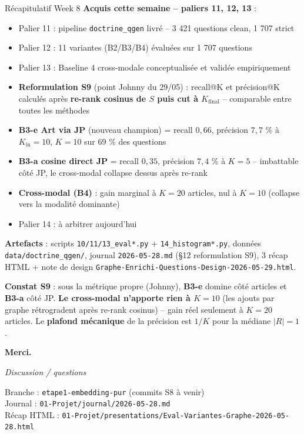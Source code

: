 \documentclass[aspectratio=169,10pt]{beamer}
\newcommand{\okbox}[1]{%
  \begin{center}
  \colorbox{green!10}{\parbox{0.92\linewidth}{\centering #1}}
  \end{center}}
\begin{document}
\begin{frame}{Récapitulatif Week 8}
  \footnotesize
  \textbf{Acquis cette semaine -- paliers 11, 12, 13} :
  \begin{itemize}\setlength\itemsep{0.2em}
    \item Palier 11 : pipeline \texttt{doctrine\_qgen} livré -- 3 421 questions clean, 1 707 strict
    \item Palier 12 : 11 variantes (B2/B3/B4) évaluées sur 1 707 questions
    \item Palier 13 : Baseline 4 cross-modale conceptualisée et validée empiriquement
    \item \textbf{Reformulation S9} (point Johnny du 29/05) : recall@K et précision@K calculés
    après \textbf{re-rank cosinus de $S$ puis cut à $K_{\text{final}}$} -- comparable entre
    toutes les méthodes
    \item \textbf{B3-e Art via JP} (nouveau champion) = recall $0{,}66$, précision $7{,}7$ \%
    à $K_{\text{in}}{=}10$, $K{=}10$ sur 69 \% des questions
    \item \textbf{B3-a cosine direct JP} = recall $0{,}35$, précision $7{,}4$ \% à $K{=}5$
    -- imbattable côté JP, le cross-modal collapse dessus après re-rank
    \item \textbf{Cross-modal (B4)} : gain marginal à $K{=}20$ articles, nul à $K{=}10$
    (collapse vers la modalité dominante)
    \item Palier 14 : à arbitrer aujourd'hui
  \end{itemize}

  \vspace{0.3em}
  \textbf{Artefacts} : scripts \texttt{10/11/13\_eval*.py} + \texttt{14\_histogram*.py},
  données \texttt{data/doctrine\_qgen/}, journal \texttt{2026-05-28.md} (§12 reformulation S9),
  3 récap HTML + note de design \texttt{Graphe-Enrichi-Questions-Design-2026-05-29.html}.

  \vspace{0.3em}
  \okbox{\textbf{Constat S9} : sous la métrique propre (Johnny), \textbf{B3-e} domine côté
  articles et \textbf{B3-a} côté JP. \textbf{Le cross-modal n'apporte rien à $K{=}10$}
  (les ajouts par graphe rétrogradent après re-rank cosinus) -- gain réel seulement à $K{=}20$
  articles. Le \textbf{plafond mécanique} de la précision est $1/K$ pour la médiane $|R|=1$.}
\end{frame}

\begin{frame}
  \begin{center}
    \vspace{2em}
    {\Large\textbf{Merci.}}
    \vspace{2em}

    \textit{Discussion / questions}

    \vspace{2em}
    \footnotesize
    Branche : \texttt{etape1-embedding-pur} (commits S8 à venir)\\
    Journal : \texttt{01-Projet/journal/2026-05-28.md}\\
    Récap HTML : \texttt{01-Projet/presentations/Eval-Variantes-Graphe-2026-05-28.html}
  \end{center}
\end{frame}
\end{document}
